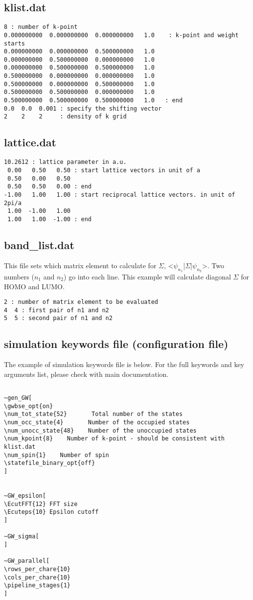 \documentclass[12pt,draft]{article}
\newcommand{\note}[1]{{\bf \large \color{red} #1}}
\begin{document}
\subsection{klist.dat}
\begin{verbatim}
8 : number of k-point
0.000000000  0.000000000  0.000000000   1.0    : k-point and weight starts 
0.000000000  0.000000000  0.500000000   1.0
0.000000000  0.500000000  0.000000000   1.0
0.000000000  0.500000000  0.500000000   1.0
0.500000000  0.000000000  0.000000000   1.0
0.500000000  0.000000000  0.500000000   1.0
0.500000000  0.500000000  0.000000000   1.0
0.500000000  0.500000000  0.500000000   1.0   : end
0.0  0.0  0.001 : specify the shifting vector
2    2    2     : density of k grid
\end{verbatim}

\subsection{lattice.dat}
\begin{verbatim}
10.2612 : lattice parameter in a.u.
 0.00   0.50   0.50 : start lattice vectors in unit of a 
 0.50   0.00   0.50
 0.50   0.50   0.00 : end
-1.00   1.00   1.00 : start reciprocal lattice vectors. in unit of 2pi/a
 1.00  -1.00   1.00 
 1.00   1.00  -1.00 : end
\end{verbatim}

\subsection{band\_list.dat}
This file sets which matrix element to calculate for $\Sigma$, <$\psi_{n_1}$|$\Sigma$|$\psi_{n_2}$>. Two numbers ($n_1$ and $n_2$) go into each line. This example will calculate diagonal $\Sigma$ for HOMO and LUMO. 
\begin{verbatim}
2 : number of matrix element to be evaluated
4  4 : first pair of n1 and n2
5  5 : second pair of n1 and n2
\end{verbatim}


\subsection{simulation keywords file (configuration file)}
The example of simulation keywords file is below. For the full keywords and key arguments list, please check with main documentation.
\begin{verbatim}

~gen_GW[
\gwbse_opt{on}       
\num_tot_state{52}       Total number of the states
\num_occ_state{4}       Number of the occupied states 
\num_unocc_state{48}    Number of the unoccupied states
\num_kpoint{8}    Number of k-point - should be consistent with klist.dat
\num_spin{1}    Number of spin
\statefile_binary_opt{off} 
]


~GW_epsilon[
\EcutFFT{12} FFT size 
\Ecuteps{10} Epsilon cutoff
]

~GW_sigma[
]

~GW_parallel[
\rows_per_chare{10}
\cols_per_chare{10}
\pipeline_stages{1}
]

\end{verbatim}
\end{document}
